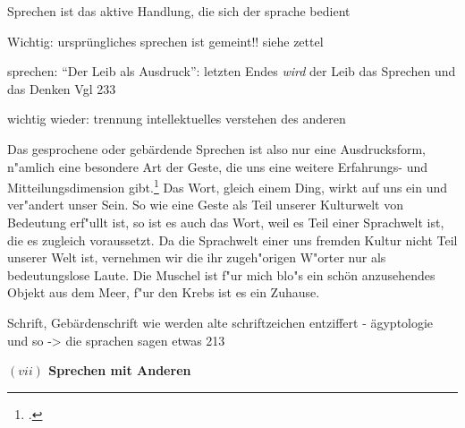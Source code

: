 \documentclass[a4paper, 12pt]{article}
\begin{document}
\begin{onehalfspace}
Sprechen ist das aktive Handlung, die sich der sprache bedient

Wichtig: ursprüngliches sprechen ist gemeint!! siehe zettel

sprechen: "`Der Leib als Ausdruck"': letzten Endes \emph{wird} der Leib das Sprechen und das Denken Vgl 233

wichtig wieder: trennung intellektuelles verstehen des anderen

Das gesprochene oder gebärdende Sprechen ist also nur eine Ausdrucksform, n"amlich eine besondere Art der Geste, die uns eine weitere Erfahrungs- und Mitteilungsdimension gibt.\footnote{\cite[Vgl.][S. 216 f.]{merleau1966phanomenologie}.} Das Wort, gleich einem Ding, wirkt auf uns ein und ver"andert unser Sein. So wie eine Geste als Teil unserer Kulturwelt von Bedeutung erf"ullt ist, so ist es auch das Wort, weil es Teil einer Sprachwelt ist, die es zugleich voraussetzt. Da die Sprachwelt einer uns fremden Kultur nicht Teil unserer Welt ist, vernehmen wir die ihr zugeh"origen W"orter nur als bedeutungslose Laute. Die Muschel ist f"ur mich blo"s ein schön anzusehendes Objekt aus dem Meer, f"ur den Krebs ist es ein Zuhause. 

Schrift, Gebärdenschrift
wie werden alte schriftzeichen entziffert - ägyptologie und so
	-> die sprachen sagen etwas 213


\vspace{5mm}

\noindent\textbf{$(vii)$ Sprechen mit Anderen}

\noindent



\end{onehalfspace}
\nocite{*}
%
\printbibliography
\end{document}
